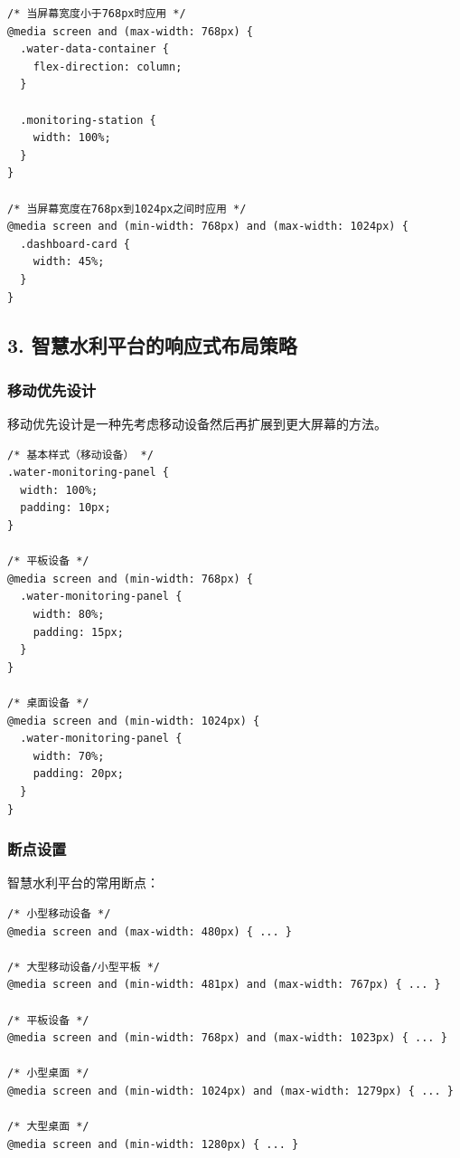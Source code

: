 \begin{lstlisting}
/* 当屏幕宽度小于768px时应用 */
@media screen and (max-width: 768px) {
  .water-data-container {
    flex-direction: column;
  }
  
  .monitoring-station {
    width: 100%;
  }
}

/* 当屏幕宽度在768px到1024px之间时应用 */
@media screen and (min-width: 768px) and (max-width: 1024px) {
  .dashboard-card {
    width: 45%;
  }
}
\end{lstlisting}

\subsection{3.
智慧水利平台的响应式布局策略}\label{ux667aux6167ux6c34ux5229ux5e73ux53f0ux7684ux54cdux5e94ux5f0fux5e03ux5c40ux7b56ux7565}

\subsubsection{移动优先设计}\label{ux79fbux52a8ux4f18ux5148ux8bbeux8ba1}

移动优先设计是一种先考虑移动设备然后再扩展到更大屏幕的方法。

\begin{lstlisting}
/* 基本样式（移动设备） */
.water-monitoring-panel {
  width: 100%;
  padding: 10px;
}

/* 平板设备 */
@media screen and (min-width: 768px) {
  .water-monitoring-panel {
    width: 80%;
    padding: 15px;
  }
}

/* 桌面设备 */
@media screen and (min-width: 1024px) {
  .water-monitoring-panel {
    width: 70%;
    padding: 20px;
  }
}
\end{lstlisting}

\subsubsection{断点设置}\label{ux65adux70b9ux8bbeux7f6e}

智慧水利平台的常用断点：

\begin{lstlisting}
/* 小型移动设备 */
@media screen and (max-width: 480px) { ... }

/* 大型移动设备/小型平板 */
@media screen and (min-width: 481px) and (max-width: 767px) { ... }

/* 平板设备 */
@media screen and (min-width: 768px) and (max-width: 1023px) { ... }

/* 小型桌面 */
@media screen and (min-width: 1024px) and (max-width: 1279px) { ... }

/* 大型桌面 */
@media screen and (min-width: 1280px) { ... }
\end{lstlisting}

